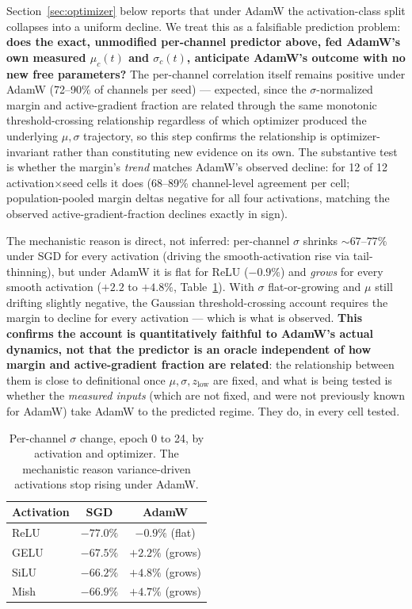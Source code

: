 \documentclass{article}
\begin{document}
Section~\ref{sec:optimizer} below reports that under AdamW the activation-class split collapses into a uniform decline. We treat this as a falsifiable prediction problem: \textbf{does the exact, unmodified per-channel predictor above, fed AdamW's own measured $\mu_c(t)$ and $\sigma_c(t)$, anticipate AdamW's outcome with no new free parameters?} The per-channel correlation itself remains positive under AdamW (72--90\% of channels per seed) --- expected, since the $\sigma$-normalized margin and active-gradient fraction are related through the same monotonic threshold-crossing relationship regardless of which optimizer produced the underlying $\mu,\sigma$ trajectory, so this step confirms the relationship is optimizer-invariant rather than constituting new evidence on its own. The substantive test is whether the margin's \emph{trend} matches AdamW's observed decline: for 12 of 12 activation$\times$seed cells it does (68--89\% channel-level agreement per cell; population-pooled margin deltas negative for all four activations, matching the observed active-gradient-fraction declines exactly in sign).

The mechanistic reason is direct, not inferred: per-channel $\sigma$ shrinks $\sim\!67$--$77\%$ under SGD for every activation (driving the smooth-activation rise via tail-thinning), but under AdamW it is flat for ReLU ($-0.9\%$) and \emph{grows} for every smooth activation ($+2.2$ to $+4.8\%$, Table~\ref{tab:sigma_optimizer}). With $\sigma$ flat-or-growing and $\mu$ still drifting slightly negative, the Gaussian threshold-crossing account requires the margin to decline for every activation --- which is what is observed. \textbf{This confirms the account is quantitatively faithful to AdamW's actual dynamics, not that the predictor is an oracle independent of how margin and active-gradient fraction are related}: the relationship between them is close to definitional once $\mu,\sigma,z_{\mathrm{low}}$ are fixed, and what is being tested is whether the \emph{measured inputs} (which are not fixed, and were not previously known for AdamW) take AdamW to the predicted regime. They do, in every cell tested.

\begin{table}[t]
\centering
\caption{Per-channel $\sigma$ change, epoch 0 to 24, by activation and optimizer. The mechanistic reason variance-driven activations stop rising under AdamW.}
\label{tab:sigma_optimizer}
\begin{tabular}{lcc}
\toprule
Activation & SGD & AdamW\\
\midrule
ReLU & $-77.0\%$ & $-0.9\%$ (flat)\\
GELU & $-67.5\%$ & $+2.2\%$ (grows)\\
SiLU & $-66.2\%$ & $+4.8\%$ (grows)\\
Mish & $-66.9\%$ & $+4.7\%$ (grows)\\
\bottomrule
\end{tabular}
\end{table}
\end{document}
